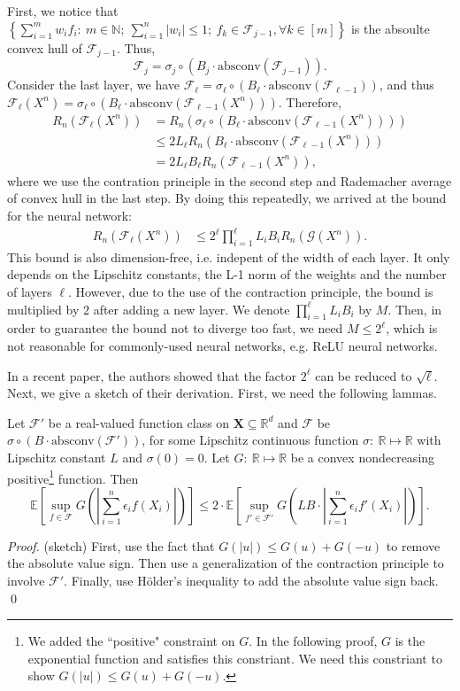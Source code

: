 \documentclass[12pt]{llncs}
\newcommand{\E}[1]{\mathbb{E}\left[#1\right]}
\newcommand{\F}{\mathcal{F}}
\newcommand{\reals}{\mathbb{R}}
\newcommand{\X}{\mathbf{X}}
\begin{document}
First, we notice that $\left\{ \sum_{i=1}^{m} w_i f_i :\ m \in \mathbb{N};\ \sum_{i=1}^{n} |w_i| \leq 1;\ f_k \in \F_{j-1}, \forall k \in [m] \right\}$ is the absoulte convex hull of $\F_{j-1}$. Thus, $$\F_j = \sigma_j \circ (B_j \cdot \text{absconv}(\F_{j-1})).$$ Consider the last layer, we have $\F_\ell = \sigma_\ell \circ (B_\ell \cdot \text{absconv}(\F_{\ell-1}))$, and thus $\F_\ell(X^n) = \sigma_\ell \circ (B_\ell \cdot \text{absconv}(\F_{\ell-1}(X^n)))$. Therefore,
\begin{align*}
  R_n(\F_\ell(X^n)) &= R_n(\sigma_\ell \circ (B_\ell \cdot \text{absconv}(\F_{\ell-1}(X^n))))\\ &\leq 2 L_\ell R_n(B_\ell \cdot \text{absconv}(\F_{\ell-1}(X^n)))\\ &= 2 L_\ell B_\ell R_n(\F_{\ell-1}(X^n)),
\end{align*}
where we use the contration principle in the second step and Rademacher average of convex hull in the last step. By doing this repeatedly, we arrived at the bound for the neural network:
\begin{align}
  R_n(\F_\ell(X^n)) &\leq 2^\ell \prod_{i=1}^{\ell} L_i B_i R_n(\mathcal{G}(X^n)).
\end{align}
This bound is also dimension-free, i.e. indepent of the width of each layer. It only depends on the Lipschitz constants, the L-1 norm of the weights and the number of layers $\ell$. However, due to the use of the contraction principle, the bound is multiplied by $2$ after adding a new layer. We denote $\prod_{i=1}^{\ell} L_i B_i$ by $M$. Then, in order to guarantee the bound not to diverge too fast, we need $M \leq 2^\ell$, which is not reasonable for commonly-used neural networks, e.g. ReLU neural networks.

In a recent paper\cite{golowich2017size}, the authors showed that the factor $2^\ell$ can be reduced to $\sqrt{\ell}$. Next, we give a sketch of their derivation. First, we need the following lammas.

\begin{lemma}
  \label{lemma1}
  Let $\F'$ be a real-valued function class on $\X \subseteq \reals^d$ and $\F$ be $\sigma \circ (B \cdot \text{absconv}(\F'))$, for some Lipschitz continuous function $\sigma :\ \reals \mapsto \reals$ with Lipschitz constant $L$ and $\sigma(0) = 0$. Let $G:\ \reals \mapsto \reals$ be a convex nondecreasing positive\footnote{We added the ``positive" constraint on $G$. In the following proof, $G$ is the exponential function and satisfies this constriant. We need this constriant to show $G(|u|) \leq G(u) + G(-u)$.} function. Then $$\E{\sup\limits_{f \in \F}G\left(\left|\sum_{i=1}^{n}\epsilon_i f(X_i)\right|\right)} \leq 2 \cdot \E{\sup\limits_{f' \in \F'}G\left(LB \cdot \left|\sum_{i=1}^{n}\epsilon_i f'(X_i)\right|\right)}.$$
\end{lemma}
\begin{proof}(sketch) First, use the fact that $G(|u|) \leq G(u) + G(-u)$ to remove the absolute value sign. Then use a generalization of the contraction principle to involve $\F'$. Finally, use H\"older's inequality to add the absolute value sign back. \qed
\end{proof}
\end{document}

